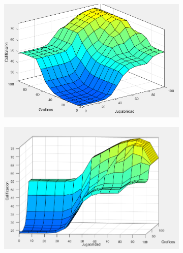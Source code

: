 \documentclass[11pt, letterpaper]{article}
\begin{document}
\begin{figure}[h]
	\centering
	\begin{subfigure}{0.42\textwidth} %
		\centering
		\includegraphics[width=1.3\textwidth]{IMG/P15.png}
		\label{fig:G1}
	\end{subfigure}
	\hfill
	\begin{subfigure}{0.42\textwidth} %
		\centering
		\includegraphics[width=1.2\textwidth]{IMG/P16.png}
		\label{fig:G2}
	\end{subfigure}
	\label{fig:comparacion1}
\end{figure}
\end{document}
